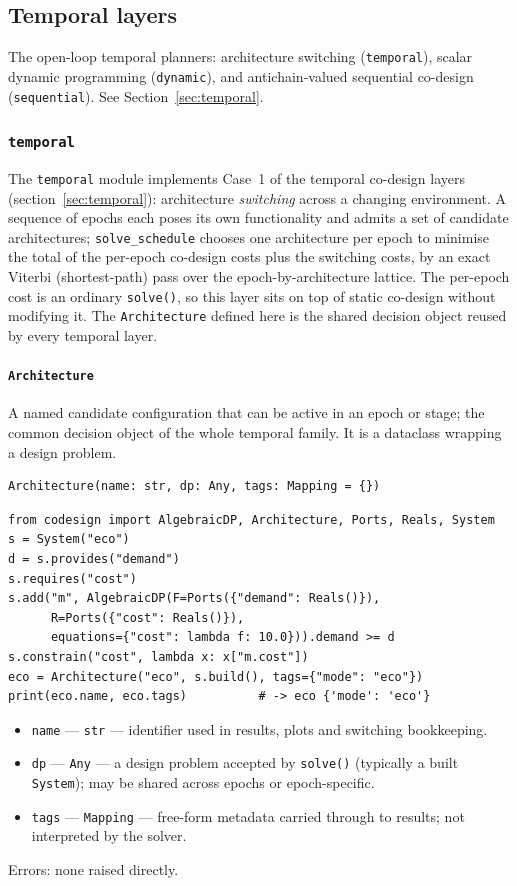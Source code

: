 \documentclass[11pt,a4paper]{article}
\begin{document}
\subsection{Temporal layers}

The open-loop temporal planners: architecture switching
(\texttt{temporal}), scalar dynamic programming (\texttt{dynamic}), and
antichain-valued sequential co-design (\texttt{sequential}). See
Section~\ref{sec:temporal}.

\subsubsection{\texttt{temporal}}\label{ref:temporal}

The \texttt{temporal} module implements Case~1 of the temporal co-design
layers (section~\ref{sec:temporal}): architecture \emph{switching} across a
changing environment. A sequence of epochs each poses its own functionality
and admits a set of candidate architectures; \texttt{solve\_schedule}
chooses one architecture per epoch to minimise the total of the per-epoch
co-design costs plus the switching costs, by an exact Viterbi
(shortest-path) pass over the epoch-by-architecture lattice. The per-epoch
cost is an ordinary \texttt{solve()}, so this layer sits on top of static
co-design without modifying it. The \texttt{Architecture} defined here is
the shared decision object reused by every temporal layer.

\paragraph{\texttt{Architecture}}\label{ref:temporal:architecture}
A named candidate configuration that can be active in an epoch or stage;
the common decision object of the whole temporal family. It is a
dataclass wrapping a design problem.
\begin{lstlisting}
Architecture(name: str, dp: Any, tags: Mapping = {})
\end{lstlisting}
\begin{lstlisting}
from codesign import AlgebraicDP, Architecture, Ports, Reals, System
s = System("eco")
d = s.provides("demand")
s.requires("cost")
s.add("m", AlgebraicDP(F=Ports({"demand": Reals()}),
      R=Ports({"cost": Reals()}),
      equations={"cost": lambda f: 10.0})).demand >= d
s.constrain("cost", lambda x: x["m.cost"])
eco = Architecture("eco", s.build(), tags={"mode": "eco"})
print(eco.name, eco.tags)          # -> eco {'mode': 'eco'}
\end{lstlisting}
\begin{itemize}[nosep]
  \item \texttt{name} --- \texttt{str} --- identifier used in results, plots
    and switching bookkeeping.
  \item \texttt{dp} --- \texttt{Any} --- a design problem accepted by
    \texttt{solve()} (typically a built \texttt{System}); may be shared
    across epochs or epoch-specific.
  \item \texttt{tags} --- \texttt{Mapping} --- free-form metadata carried
    through to results; not interpreted by the solver.
\end{itemize}
Errors: none raised directly.
\end{document}
